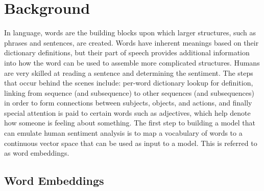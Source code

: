 \section{Background}
In language, words are the building blocks upon which larger structures, such as phrases and sentences, are created. Words have inherent meanings based on their dictionary definitions, but their part of speech provides additional information into how the word can be used to assemble more complicated structures. Humans are very skilled at reading a sentence and determining the sentiment. The steps that occur behind the scenes include: per-word dictionary lookup for definition, linking from sequence (and subsequence) to other sequences (and subsequences) in order to form connections between subjects, objects, and actions, and finally special attention is paid to certain words such as adjectives, which help denote how someone is feeling about something. The first step to building a model that can emulate human sentiment analysis is to map a vocabulary of words to a continuous vector space that can be used as input to a model. This is referred to as word embeddings.  
\subsection{Word Embeddings}

